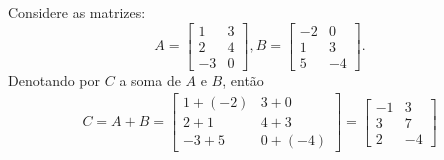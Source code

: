 \documentclass{beamer}
\begin{document}
  \begin{frame}
    \begin{exemplos}
      Considere as matrizes:
      \[
        A = \begin{bmatrix}
          1 & 3\\
          2 & 4\\
          -3 & 0
        \end{bmatrix}, 
       B = \begin{bmatrix}
          -2 & 0\\
          1 & 3\\
          5 & -4 
        \end{bmatrix}.
    \]
    Denotando por $C$ a soma de $A$ e $B$, então
    \begin{eqnarray*}
     C = A + B = \begin{bmatrix}
       1 + (-2) & 3 + 0\\
       2 + 1 & 4 + 3\\
       -3 + 5 & 0 + (-4)
     \end{bmatrix} = \begin{bmatrix}
      -1 & 3\\
      3 & 7\\
      2 & -4
     \end{bmatrix} 
    \end{eqnarray*}
    \end{exemplos}
  \end{frame}
\end{document}
